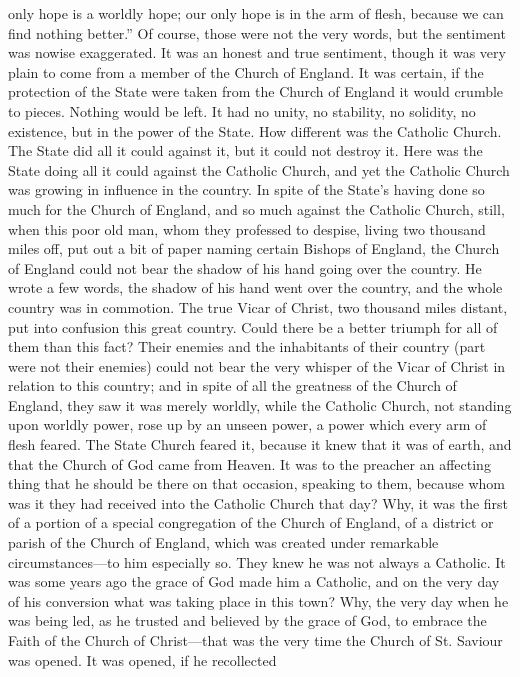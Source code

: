 only hope is a worldly hope; our only hope is in the arm of flesh,
because we can find nothing better.'' Of course, those were not the
very words, but the sentiment was nowise exaggerated. It was an honest
and true sentiment, though it was very plain to come from a member of
the Church of England. It was certain, if the protection of the State
were taken from the Church of England it would crumble to pieces.
Nothing would be left. It had no unity, no stability, no solidity, no
existence, but in the power of the State. How different was the
Catholic Church. The State did all it could against it, but it could
not destroy it. Here was the State doing all it could against the
Catholic Church, and yet the Catholic Church was growing in influence
in the country. In spite of the State's having done so much for the
Church of England, and so much against the Catholic Church, still,
when this poor old man, whom they professed to despise, living two
thousand miles off, put out a bit of paper naming certain Bishops of
England, the Church of England could not bear the shadow of his hand
going over the country. He wrote a few words, the shadow of his hand
went over the country, and the whole country was in commotion. The
true Vicar of Christ, two thousand miles distant, put into confusion
this great country. Could there be a better triumph for all of them
than this fact? Their enemies and the inhabitants of their country
(part were not their enemies) could not bear the very whisper of the
Vicar of Christ in relation to this country; and in spite of all the
greatness of the Church of England, they saw it was merely worldly,
while the Catholic Church, not standing upon worldly power, rose up by
an unseen power, a power which every arm of flesh feared. The State
Church feared it, because it knew that it was of earth, and that the
Church of God came from Heaven. It was to the preacher an affecting
thing that he should be there on that occasion, speaking to them,
because whom was it they had received into the Catholic Church that
day? Why, it was the first of a portion of a special congregation of
the Church of England, of a district or parish of the Church of
England, which was created under remarkable circumstances—to him
especially so. They knew he was not always a Catholic. It was some
years ago the grace of God made him a Catholic, and on the very day of
his conversion what was taking place in this town? Why, the very day
when he was being led, as he trusted and believed by the grace of God,
to embrace the Faith of the Church of Christ—that was the very time
the Church of St. Saviour was opened. It was opened, if he recollected
